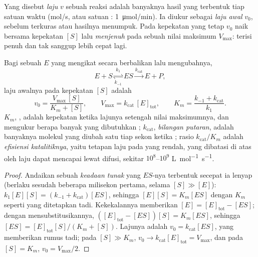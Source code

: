 \begin{definition}\label{def:b1:enzymes:rate}
Yang disebut \emph{laju} $v$ sebuah reaksi 
adalah banyaknya hasil yang terbentuk tiap satuan waktu (\unit{mol/s},
atau satuan : \qty{1}{\micro mol/min}). Ia diukur sebagai
\emph{laju awal} $v_0$, sebelum  terkuras atau hasilnya
menumpuk. Pada kepekatan  yang tetap $v_0$ naik bersama kepekatan
 $[S]$ lalu \emph{menjenuh} pada sebuah nilai maksimum
$V_{\max}$:  terisi penuh dan tak sanggup lebih cepat lagi.
\end{definition}

\begin{theorem}\label{thm:b1:enzymes:mm}
Bagi sebuah  $E$ yang mengikat  secara berbalikan lalu
mengubahnya,
\[
E + S \underset{k_{-1}}{\overset{k_1}{\rightleftharpoons}} ES
\overset{k_{\text{cat}}}{\longrightarrow} E + P ,
\]
laju awalnya pada kepekatan  $[S]$ adalah
\[
v_0 = \frac{V_{\max}\,[S]}{K_m + [S]}, \qquad V_{\max} = k_{\text{cat}}\,[E]_{\text{tot}},
\qquad K_m = \frac{k_{-1} + k_{\text{cat}}}{k_1} .
\]
$K_m$, \emph{}, adalah kepekatan  ketika
lajunya setengah nilai maksimumnya, dan mengukur berapa banyak 
yang dibutuhkan ; $k_{\text{cat}}$, \emph{bilangan
putaran}, adalah banyaknya molekul  yang
diubah satu  tiap sekon ketika ; rasio $k_{\text{cat}}/K_m$
adalah \emph{efisiensi katalitiknya}, yaitu tetapan laju pada 
yang rendah, yang dibatasi di atas oleh laju  dapat mencapai
 lewat difusi, sekitar
$10^8$--$10^9$ \unit{L.mol^{-1}.s^{-1}}.
\end{theorem}
\begin{proof}
Andaikan sebuah \emph{keadaan tunak} yang $ES$-nya terbentuk secepat ia
lenyap (berlaku sesudah beberapa milisekon pertama, selama
$[S] \gg [E]$): $k_1[E][S] = (k_{-1} + k_{\text{cat}})[ES]$, sehingga
$[E][S] = K_m[ES]$ dengan $K_m$ seperti yang ditetapkan tadi.
Kekekalannya memberikan $[E] = [E]_{\text{tot}} -
[ES]$; dengan mensubstitusikannya, $([E]_{\text{tot}} - [ES])[S] = K_m[ES]$,
sehingga $[ES] = [E]_{\text{tot}}[S]/(K_m + [S])$. Lajunya adalah
$v_0 = k_{\text{cat}}[ES]$, yang memberikan rumus tadi; pada
$[S] \gg K_m$, $v_0 \to k_{\text{cat}}[E]_{\text{tot}} = V_{\max}$, dan
pada $[S] = K_m$,
$v_0 = V_{\max}/2$.
\end{proof}

